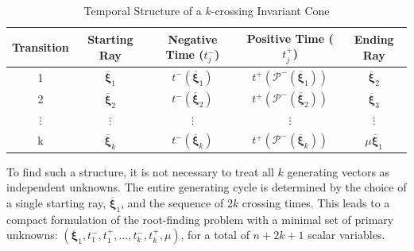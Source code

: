 \documentclass[a4paper,9pt,parskip=half,english]{article}
\theoremstyle{plain}
\theoremstyle{definition}
\newcommand{\vxi}{\bm{\xi}}
\begin{document}
\begin{table}[h!]
	\centering
	\caption{Temporal Structure of a $k$-crossing Invariant Cone}
	\label{tab:crossing_times_k}
	\begin{tabular}{c|c|c|c|c}
		\hline
		\textbf{Transition} & \textbf{Starting Ray} & \textbf{Negative Time ($t_j^-$)} & \textbf{Positive Time ($t_j^+$)} & \textbf{Ending Ray} \\
		\hline
		1 & $\overline{\vxi}_1$ & $t^-(\overline{\vxi}_1)$ & $t^+(\mathcal{P}^-(\overline{\vxi}_1))$ & $\overline{\vxi}_2$ \\
		2 & $\overline{\vxi}_2$ & $t^-(\overline{\vxi}_2)$ & $t^+(\mathcal{P}^-(\overline{\vxi}_2))$ & $\overline{\vxi}_3$ \\
		$\vdots$ & $\vdots$ & $\vdots$ & $\vdots$ & $\vdots$ \\
		k & $\overline{\vxi}_k$ & $t^-(\overline{\vxi}_k)$ & $t^+(\mathcal{P}^-(\overline{\vxi}_k))$ & $\mu \overline{\vxi}_1$ \\
		\hline
	\end{tabular}
\end{table}

To find such a structure, it is not necessary to treat all $k$ generating vectors as independent unknowns. The entire generating cycle is determined by the choice of a single starting ray, $\overline{\vxi}_1$, and the sequence of $2k$ crossing times. This leads to a compact formulation of the root-finding problem with a minimal set of primary unknowns: $(\overline{\vxi}_1, t_1^-, t_1^+, \dots, t_k^-, t_k^+, \mu)$, for a total of $n + 2k + 1$ scalar variables.
\end{document}
